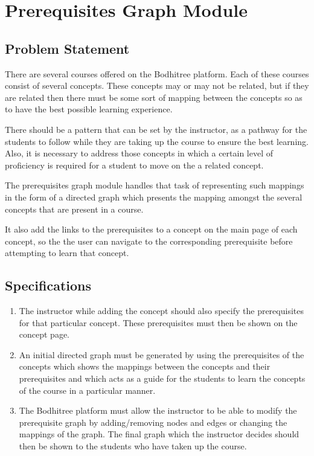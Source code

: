 \section{Prerequisites Graph Module}

\subsection{Problem Statement}

\hspace{0.45cm} There are several courses offered on the Bodhitree platform. Each of these courses consist of several concepts. These concepts may or may not be related, but if they are related then there must be some sort of mapping between the concepts so as to have the best possible learning experience.
\par There should be a pattern that can be set by the instructor, as a pathway for the students to follow while they are taking up the course to ensure the best learning. Also, it is necessary to address those concepts in which a certain level of proficiency is required for a student to move on the a related concept.
\par The prerequisites graph module handles that task of representing such mappings in the form of a directed graph which presents the mapping amongst the several concepts that are present in a course.
\par It also add the links to the prerequisites to a concept on the main page of each concept, so the the user can navigate to the corresponding prerequisite before attempting to learn that concept.

\subsection{Specifications}

\begin{enumerate}
	
	\item The instructor while adding the concept should also specify the prerequisites for that particular concept. These prerequisites must then be shown on the concept page.
	
	\item An initial directed graph must be generated by using the prerequisites of the concepts which shows the mappings between the concepts and their prerequisites and which acts as a guide for the students to learn the concepts of the course in a particular manner.
	
	\item The Bodhitree platform must allow the instructor to be able to modify the prerequisite graph by adding/removing nodes and edges or changing the mappings of the graph. The final graph which the instructor decides should then be shown to the students who have taken up the course.

\end{enumerate}

